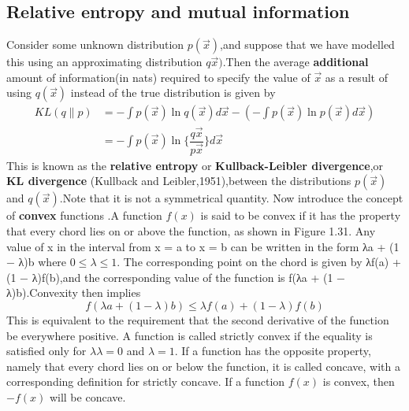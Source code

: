 \subsection{Relative entropy and mutual information}
Consider some unknown distribution $p(\vec{x})$,and suppose that we have modelled this using an approximating distribution $q\vec{x})$.Then the average \textbf{additional} amount of information(in nats) required to specify the value of $\vec{x}$ as a result of using $q(\vec{x})$ instead of the true distribution is given by 
\begin{align}
KL(q\parallel p) &= -\int p(\vec{x})\ln q(\vec{x}) d\vec{x} - (- \int p(\vec{x}) \ln p(\vec{x})d\vec{x}) \\
& = -\int p(\vec{x})\ln \{\dfrac{q\vec{x}}{p\vec{x}}\}d\vec{x}
\end{align}
This is known as the \textbf{relative  entropy} or \textbf{Kullback-Leibler divergence},or \textbf{KL divergence} (Kullback and Leibler,1951),between the distributions $p(\vec{x})$ and $q(\vec{x})$.Note that it is not a symmetrical quantity.
Now introduce the  concept of \textbf{convex} functions .A function $f(x)$ is said to be convex if it has the property that every chord lies on or above the function, as shown in Figure 1.31. Any value of x in the interval from x = a to x = b can be written in the form λa + (1 − λ)b where $0 \leq λ \leq 1$. The corresponding point on the chord is given by λf(a) + (1 − λ)f(b),and the corresponding value of the function is f(λa + (1 − λ)b).Convexity then implies
\begin{equation}
f(\lambda a + (1-\lambda)b) \leq \lambda f(a) + (1-\lambda) f(b)
\end{equation}
This is equivalent to the requirement that the second derivative of the function be everywhere positive. A function is called strictly convex if the equality is satisfied only for $λ\lambda = 0$ and $λ = 1$. If a function has the opposite property, namely that every chord lies on or below the function, it is called concave, with a corresponding definition for strictly concave. If a function $f(x)$ is convex, then $−f(x)$ will be concave.

